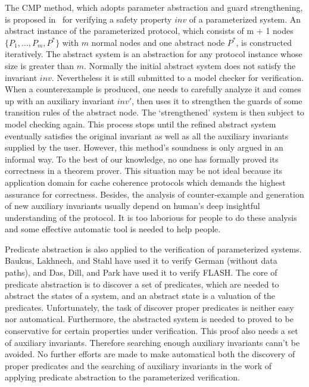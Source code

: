 \documentclass[final]{IEEEtran}
\begin{document}
The CMP method, which adopts parameter abstraction and guard strengthening, is proposed
in~\cite{Chou2004} for verifying a safety property $inv$ of
a parameterized system.
 An abstract instance of the parameterized protocol,  which consists of m + 1
nodes $\{P_1, \ldots , P_m, P^*\}$ with $m$ normal nodes and one
abstract node $P^*$, is constructed iteratively. The abstract system is an
abstraction for any protocol instance whose size is greater than
$m$. Normally the initial abstract system does not satisfy the
invariant $inv$. Nevertheless it is still submitted to a model
checker for verification. When a counterexample is produced, one needs to
carefully analyze it and comes up with an auxiliary invariant
$inv'$, then uses it to strengthen the guards of some transition
rules of the abstract node. The `strengthened' system is then
subject to model checking again. This process stops until the
refined abstract system  eventually satisfies the original invariant
  as well as all the auxiliary invariants supplied by the
user. However, this method's soundness is only argued in an
informal way. To the best of our knowledge, no one has
formally proved its correctness in a theorem prover. This
situation may be not ideal because its application domain for cache
coherence protocols  which demands the highest assurance for
correctness. Besides, the analysis of counter-example and generation of new auxiliary invariants usually
 depend on human's deep insightful understanding of the protocol. It is too laborious for people to do these analysis and some effective automatic  tool is needed to help people.

 Predicate abstraction is also applied to the verification of parameterized systems. Baukus, Lakhnech, and Stahl  have used it to verify German (without data paths)\cite{Baukus2002}, and
 Das, Dill, and Park have used it to verify    FLASH\cite{Park1996a}.  The core of predicate abstraction is to discover  a set of predicates, which are needed  to abstract the states of a system, and an abstract state is a valuation of the predicates. Unfortunately, the task of discover proper predicates is neither easy nor automatical. Furthermore, the abstracted system is needed to proved to be conservative for certain properties under verification. This proof also needs a set of auxiliary invariants. Therefore searching enough auxiliary invariants cann't be avoided. No further efforts are made to make automatical both the discovery of proper predicates and the searching of auxiliary invariants in the work of applying predicate abstraction to the parameterized verification.
\end{document}
